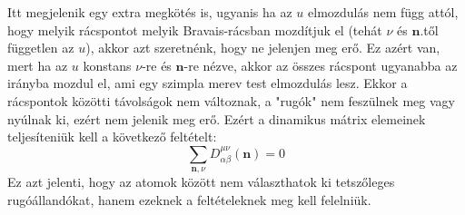 \documentclass[../main.tex]{subfiles}
\begin{document}
Itt megjelenik egy extra megkötés is, ugyanis ha az $u$ elmozdulás nem függ attól, hogy melyik rácspontot melyik Bravais-rácsban mozdítjuk el (tehát $\nu$ és $\mathbf{n}$.től független az $u$), akkor azt szeretnénk, hogy ne jelenjen meg erő. 
Ez azért van, mert ha az $u$ konstans $\nu$-re és $\mathbf{n}$-re nézve, akkor az összes rácspont ugyanabba az irányba mozdul el, ami egy szimpla merev test elmozdulás lesz. Ekkor a rácspontok közötti távolságok nem változnak, a "rugók" nem feszülnek meg vagy nyúlnak ki,
ezért nem jelenik meg erő. Ezért a dinamikus mátrix elemeinek teljesíteniük kell a következő feltételt:
\begin{equation}
    \sum_{\mathbf{n}, \nu} D_{\alpha \beta}^{\mu \nu} (\mathbf{n}) = 0
\end{equation}
Ez azt jelenti, hogy az atomok között nem választhatok ki tetszőleges rugóállandókat, hanem ezeknek a feltételeknek meg kell felelniük.
\end{document}
